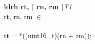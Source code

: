 


\begin{instructionblock}{\imagewidth}%
    \textbf{ldrh rt, [ rn, rm ]}\hfill\textit{T1}\\
    rt, rn, rm $\in$ \baseregisters\\
    {}\\
    rt = *((uint16\_t)(rn + rm));
\end{instructionblock}

